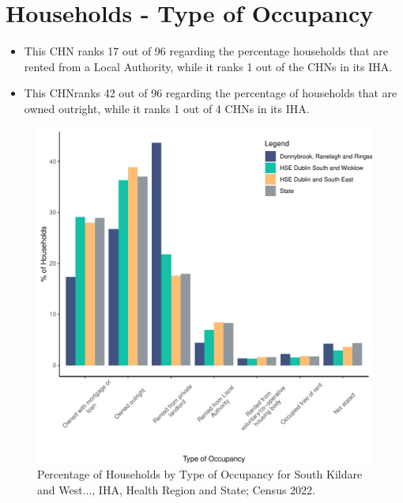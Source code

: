 \documentclass{article}
\begin{document}
\section{Households - Type of Occupancy}\label{sect:Households}
\begin{itemize}
\item This CHN ranks  17 out of 96 regarding the percentage households that are rented from a Local Authority, while it ranks  1 out of the CHNs in its IHA. 
\item This CHNranks  42 out of 96 regarding the percentage of households that are owned outright, while it ranks   1 out of 4 CHNs in its IHA.
\end{itemize}
\begin{figure}[H]
	\centering
	\includegraphics[width = 140mm]{../figures/HouseholdsED.pdf}
	\caption{Percentage of Households by Type of Occupancy for South Kildare and West..., IHA, Health Region and State; Census 2022.}
	\label{fig:vbnv}
	\end{figure}
\end{document}
